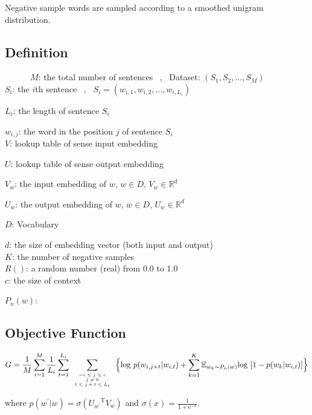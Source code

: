 \documentclass[12pt,a4paper,twoside]{book}
\begin{document}
Negative sample words are sampled according to a smoothed unigram distribution.
\subsection{Definition}
\ \ \ \ \ \ $M$: the total number of sentences \ , \ Dataset: $(S_1,S_2,\ldots,S_M)$\\

$S_i$: the $i$th sentence \ , \ $S_i = (w_{i,1},w_{i,2},\ldots,w_{i,L_i})$

$L_i$: the length of sentence $S_i$

$w_{i,j}$: the word in the position $j$ of sentence $S_i$\\

$V$: lookup table of sense input embedding 

$U$: lookup table of  sense output embedding 

$V_w$: the input embedding of $w$, $w\in D$, $V_w \in \mathbb{R}^d$

$U_w$: the output embedding of $w$, $w\in D$, $U_w \in \mathbb{R}^d$

$D$: Vocabulary 

$d$: the size of embedding vector (both input and output)\\

$K$: the number of negative samples\\

$R()$: a random number (real) from 0.0 to 1.0\\

$c$: the size of context

$P_n(w)$: 
\subsection{Objective Function}
\begin{equation}
\begin{split}
G = \frac{1}{M}\sum_{i=1}^M\frac{1}{L_i}\sum_{t=1}^{L_i}\sum\limits_{\mbox{\tiny$\begin{array}{c}-c\leq j \leq c\\ j\neq 0\\ 1\leq j+t\leq L_i\end{array}$}}\Big \{\mathrm{log}\ p(w_{i,j+t}|w_{i,t}) 
+\sum\limits_{k=1}^K\mathbb{E}_{w_k\sim P_n(w)}\mathrm{log}\ [1-p(w_k|w_{i,t}) ] \Big \}
\end{split}
\end{equation} 

where $p(w^\prime|w) = \sigma({U_{w^\prime}}^{\mathrm{T}}V_w)$
 and $\sigma(x) = \frac{1}{1+\mathrm{e}^{-x}}$. \\
 
\end{document}
